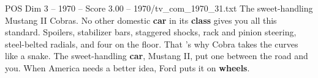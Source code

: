 \begin{textsample}{POS Dim 3 – 1970 – Score 3.00 – 1970/tv\_com\_1970\_31.txt}  \label{ex:f3_pos_033}
The sweet-handling Mustang II Cobras.
No other domestic \textbf{car} in its \textbf{class} gives you all this standard.
Spoilers, stabilizer bars, staggered shocks, rack and pinion steering, steel-belted radials, and four on the floor.
That 's why Cobra takes the curves like a snake.
The sweet-handling \textbf{car}, Mustang II, put one between the road and you.
When America needs a better idea, Ford puts it on \textbf{wheels}.

\end{textsample}
